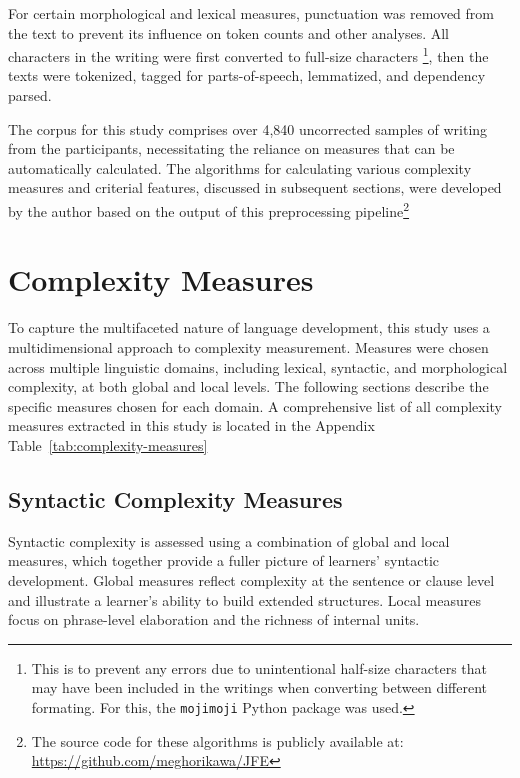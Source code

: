 For certain morphological and lexical measures, punctuation was removed from the text to prevent its influence on
token counts and other analyses. All characters in the writing were first converted to full-size characters \footnote{This is to prevent any errors due to unintentional half-size characters that may have been included in the writings when converting between different formating. For this, the \texttt{mojimoji} Python package was used.}, then
the texts were tokenized, tagged for parts-of-speech,
lemmatized, and dependency parsed.

The corpus for this study comprises over 4,840 uncorrected samples of writing from the participants, necessitating
the reliance on measures that can be automatically calculated.
 The algorithms for calculating various complexity measures and criterial features, discussed in subsequent
sections, were developed by the author based on the output of this preprocessing pipeline\footnote{The source code for
these
algorithms is publicly available at: \href{https://github.com/meghorikawa/JFE}{https://github.com/meghorikawa/JFE}}

\section{Complexity Measures}
To capture the multifaceted nature of language development, this study uses a multidimensional approach to complexity
measurement. Measures were chosen across multiple linguistic domains, including lexical, syntactic, and morphological
complexity, at both global and local levels. The following sections describe the specific measures chosen for each
domain. A comprehensive list of all complexity measures extracted in this study is located in the Appendix
Table~\ref{tab:complexity-measures}

\subsection{Syntactic Complexity Measures}
Syntactic complexity is assessed using a combination of global and local measures, which together provide a fuller
picture of learners' syntactic development. Global measures reflect complexity at the sentence or clause level
and illustrate a learner's ability to build extended structures. Local measures focus on phrase-level elaboration
and the richness of internal units.


